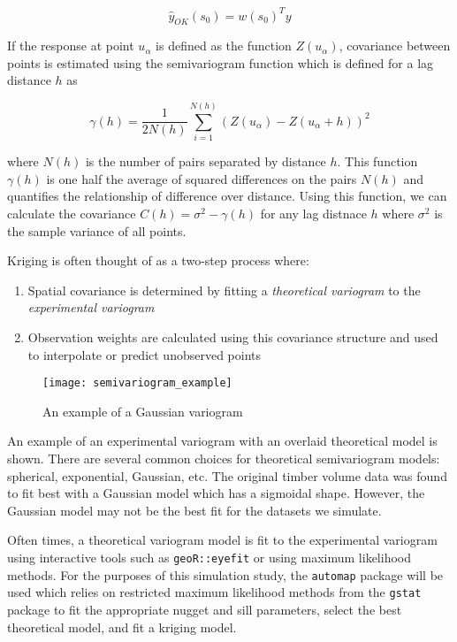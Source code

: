 \documentclass{article}
\begin{document}
$$
\hat{y}_{OK}(s_0) = w(s_0)^T y
$$

If the response at point $u_\alpha$ is defined as the function $Z(u_\alpha)$, covariance between points is estimated using the semivariogram function which is defined for a lag distance $h$ as

$$
\gamma(h) = \frac{1}{2 N(h)} \sum_{i=1}^{N(h)} (Z(u_{\alpha}) - Z(u_{\alpha} + h))^2
$$

where $N(h)$ is the number of pairs separated by distance $h$.
This function $\gamma(h)$ is one half the average of squared differences on the pairs $N(h)$ and quantifies the relationship of difference over distance.
Using this function, we can calculate the covariance $C(h) = \sigma^2 - \gamma(h)$ for any lag distnace $h$ where $\sigma^2$ is the sample variance of all points.

Kriging is often thought of as a two-step process where:

\begin{enumerate}
	\item Spatial covariance is determined by fitting a \textit{theoretical variogram} to the \textit{experimental variogram}
	\item Observation weights are calculated using this covariance structure and used to interpolate or predict unobserved points
\end{enumerate}

\begin{figure}
	\begin{centering}
\texttt{[image: semivariogram\_example]}
\caption{An example of a Gaussian variogram\label{fig:semivariogram_example}}
\end{centering}
\end{figure}

An example of an experimental variogram with an overlaid theoretical model is shown.
There are several common choices for theoretical semivariogram models: spherical, exponential, Gaussian, etc.
The original timber volume data was found to fit best with a Gaussian model which has a sigmoidal shape.
However, the Gaussian model may not be the best fit for the datasets we simulate.

Often times, a theoretical variogram model is fit to the experimental variogram using interactive tools such as \texttt{geoR::eyefit} or using maximum likelihood methods.
For the purposes of this simulation study, the \texttt{automap} package will be used which relies on restricted maximum likelihood methods from the \texttt{gstat} package to fit the appropriate nugget and sill parameters, select the best theoretical model, and fit a kriging model.
\end{document}
